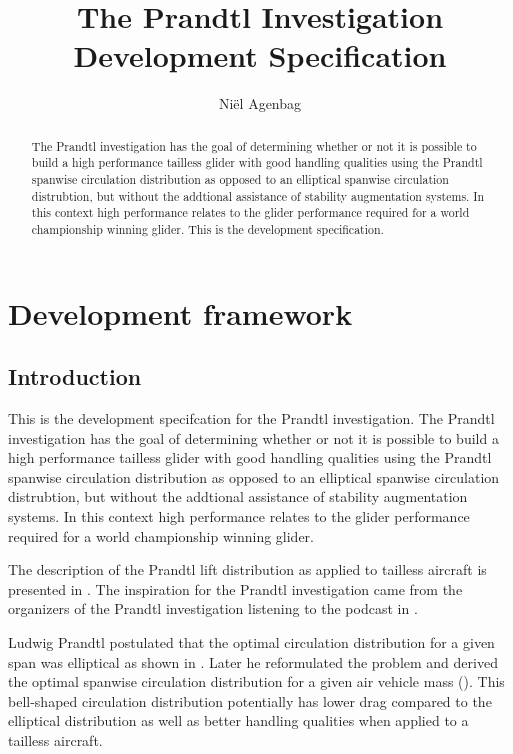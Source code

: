 \documentclass{report}
\begin{document}
\title{The Prandtl Investigation Development Specification}
\author{Ni\"el Agenbag}

\maketitle

\begin{abstract}
The Prandtl investigation has the goal of determining whether or not it is possible to build a high performance tailless glider with good handling qualities using the Prandtl spanwise circulation distribution as opposed to an elliptical spanwise circulation distrubtion, but without the addtional assistance of stability augmentation systems.  In this context high performance relates to the glider performance required for a world championship winning glider.  This is the development specification.
\end{abstract}


\chapter{Development framework}

\section{Introduction}

This is the development specifcation for the Prandtl investigation.  The Prandtl investigation has the goal of determining whether or not it is possible to build a high performance tailless glider with good handling qualities using the Prandtl spanwise circulation distribution as opposed to an elliptical spanwise circulation distrubtion, but without the addtional assistance of stability augmentation systems.  In this context high performance relates to the glider performance required for a world championship winning glider.

The description of the Prandtl lift distribution as applied to tailless aircraft is presented in \cite{PrandtlBowers}.  The inspiration for the Prandtl investigation came from the organizers of the Prandtl investigation listening to the podcast in \cite{omegataupodcastPrandtl}.

Ludwig Prandtl postulated that the optimal circulation distribution for a given span was elliptical as shown in \cite{Prandtl1921}.  Later he reformulated the problem and derived the optimal spanwise circulation distribution for a given air vehicle mass (\cite{Prandtl1933}).  This bell-shaped circulation distribution potentially has lower drag compared to the elliptical distribution as well as better handling qualities when applied to a tailless aircraft.
\end{document}
